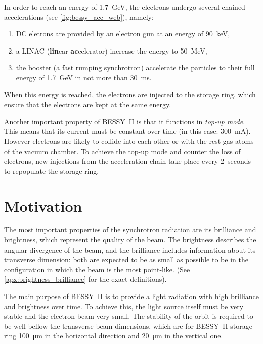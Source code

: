 In order to reach an energy of \SI{1.7}{\giga\electronvolt}, the electrons undergo several chained accelerations (see \cref{fig:bessy_acc_web}), namely:
\begin{enumerate}
    \item DC eletrons are provided by an electron gun at an energy of \SI{90}{\kilo\electronvolt},
    \item a LINAC (\textbf{lin}ear \textbf{ac}celerator) increase the energy to \SI{50}{\mega\electronvolt},
    \item the booster (a fast rumping synchrotron) accelerate the particles to their full energy of \SI{1.7}{\giga\electronvolt} in not more than \SI{30}{\milli\second}.
\end{enumerate}

When this energy is reached, the electrons are injected to the storage ring, which ensure that the electrons are kept at the same energy.

Another important property of BESSY~II is that it functions in \textit{top-up mode}. This means that its current must be constant over time (in this case: \SI{300}{\milli\ampere}). However electrons are likely to collide into each other or with the rest-gas atoms of the vacuum chamber. To achieve the top-up mode and counter the loss of electrons, new injections from the acceleration chain take place every 2~seconds to repopulate the storage ring.

\section{Motivation}
The most important properties of the synchrotron radiation are its brilliance and brightness, which represent the quality of the beam. The brightness describes the angular divergence of the beam, and the brilliance includes information about its transverse dimension: both are expected to be as small as possible to be in the configuration in which the beam is the most point-like. (See \cref{apx:brightness_brilliance} for the exact definitions).

The main purpose of BESSY~II is to provide a light radiation with high brilliance and brightness over time. To achieve this, the light source itself must be very stable and the electron beam very small. The stability of the orbit is required to be well bellow the transverse beam dimensions, which are for BESSY~II storage ring \SI{100}{\micro\meter} in the horizontal direction and \SI{20}{\micro\meter} in the vertical one.

